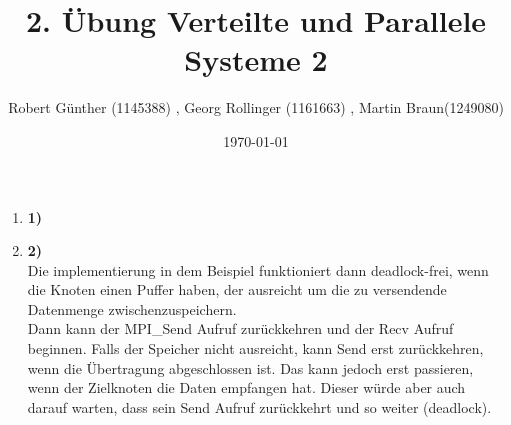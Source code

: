 \documentclass[10pt,a4paper]{article}
\title{2. Übung Verteilte und Parallele Systeme 2}
\author{ Robert Günther (1145388) , Georg Rollinger (1161663) , Martin Braun(1249080)}
\date{\today{}}
\begin{document}
\maketitle
\begin{enumerate}

\item[]{\textbf{1)} \\

}

\item[]{\textbf{2)} \\
Die implementierung in dem Beispiel funktioniert dann deadlock-frei, wenn die Knoten einen Puffer haben, der ausreicht um die zu versendende Datenmenge zwischenzuspeichern.\\
Dann kann der MPI_Send Aufruf zurückkehren und der Recv Aufruf beginnen. Falls der Speicher nicht ausreicht, kann Send erst zurückkehren, wenn die Übertragung abgeschlossen ist.
Das kann jedoch erst passieren, wenn der Zielknoten die Daten empfangen hat. Dieser würde aber auch darauf warten, dass sein Send Aufruf zurückkehrt und so weiter (deadlock).
}
\end{enumerate}
\end{document}
